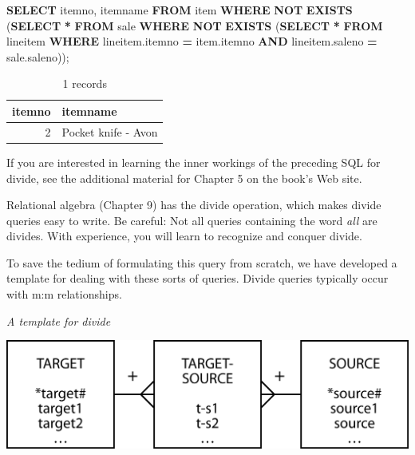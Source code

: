 \documentclass[
]{article}
\newenvironment{Shaded}{\begin{snugshade}}{\end{snugshade}}
\newcommand{\KeywordTok}[1]{\textcolor[rgb]{0.13,0.29,0.53}{\textbf{#1}}}
\newcommand{\NormalTok}[1]{#1}
\newcommand{\OperatorTok}[1]{\textcolor[rgb]{0.81,0.36,0.00}{\textbf{#1}}}
\begin{document}
\begin{Shaded}
\begin{Highlighting}[]
\KeywordTok{SELECT}\NormalTok{ itemno, itemname }\KeywordTok{FROM}\NormalTok{ item}
    \KeywordTok{WHERE} \KeywordTok{NOT} \KeywordTok{EXISTS}
\NormalTok{        (}\KeywordTok{SELECT} \OperatorTok{*} \KeywordTok{FROM}\NormalTok{ sale}
            \KeywordTok{WHERE} \KeywordTok{NOT} \KeywordTok{EXISTS}
\NormalTok{                (}\KeywordTok{SELECT} \OperatorTok{*} \KeywordTok{FROM}\NormalTok{ lineitem}
                    \KeywordTok{WHERE}\NormalTok{ lineitem.itemno }\OperatorTok{=}\NormalTok{ item.itemno}
                    \KeywordTok{AND}\NormalTok{ lineitem.saleno }\OperatorTok{=}\NormalTok{ sale.saleno));}
\end{Highlighting}
\end{Shaded}

\begin{table}

\caption{\label{tab:unnamed-chunk-67}1 records}
\centering
\begin{tabular}[t]{r|l}
\hline
itemno & itemname\\
\hline
2 & Pocket knife - Avon\\
\hline
\end{tabular}
\end{table}

If you are interested in learning the inner workings of the preceding SQL for divide, see the additional material for Chapter 5 on the book's Web site.

Relational algebra (Chapter 9) has the divide operation, which makes divide queries easy to write. Be careful: Not all queries containing the word \emph{all} are divides. With experience, you will learn to recognize and conquer divide.

To save the tedium of formulating this query from scratch, we have developed a template for dealing with these sorts of queries. Divide queries typically occur with m:m relationships.

\emph{A template for divide}

\includegraphics[width=5.89583in,height=\textheight]{Figures/Chapter 5/divide template.png}
\end{document}
